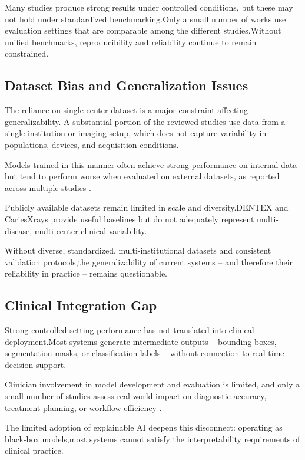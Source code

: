 \documentclass[conference]{IEEEtran}
\begin{document}
Many studies produce strong results under controlled conditions, but these may not hold under standardized benchmarking.Only a small number of works use evaluation settings that are comparable among the different studies.Without unified benchmarks, reproducibility and reliability continue to remain constrained.

\subsection{Dataset Bias and Generalization Issues}

The reliance on single-center dataset is a major constraint affecting generalizability. A substantial portion of the reviewed studies use data from a single institution or imaging setup, which does not capture variability in populations, devices, and acquisition conditions\cite{albano2024artificial,luke2025accuracy}.

Models trained in this manner often achieve strong performance on internal data but tend to perform worse when evaluated on external datasets, as reported across multiple studies \cite{muresanu2024automating}.

Publicly available datasets remain limited in scale and diversity.DENTEX and CariesXrays provide useful baselines but do not adequately represent multi-disease, multi-center clinical variability\cite{nassiri2025yolo,chen2024cariesxrays}.

Without diverse, standardized, multi-institutional datasets and consistent validation protocols,the generalizability of current systems -- and therefore their reliability in practice -- remains questionable.

\subsection{Clinical Integration Gap}

Strong controlled-setting performance has not translated into clinical deployment.Most systems generate intermediate outputs -- bounding boxes, segmentation masks, or classification labels -- without connection to real-time decision support.

Clinician involvement in model development and evaluation is limited, and only a small number of studies assess real-world impact on diagnostic accuracy, treatment planning, or workflow efficiency
\cite{schwendicke2021cost,lee2025evaluation}.

The limited adoption of explainable AI deepens this disconnect: operating as black-box models,most systems cannot satisfy the interpretability requirements of clinical practice.
\end{document}

